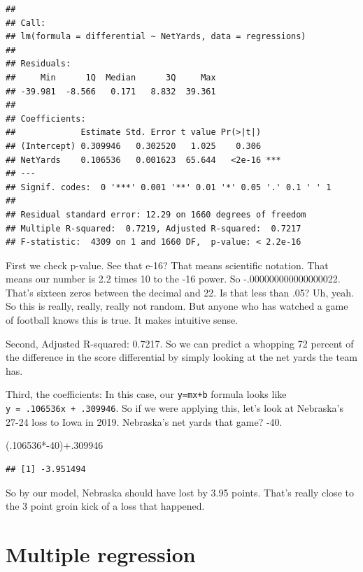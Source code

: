 \documentclass[
]{book}
\newenvironment{Shaded}{\begin{snugshade}}{\end{snugshade}}
\newcommand{\DecValTok}[1]{\textcolor[rgb]{0.00,0.00,0.81}{#1}}
\newcommand{\NormalTok}[1]{#1}
\newcommand{\SpecialCharTok}[1]{\textcolor[rgb]{0.00,0.00,0.00}{#1}}
\begin{document}
\begin{verbatim}
## 
## Call:
## lm(formula = differential ~ NetYards, data = regressions)
## 
## Residuals:
##     Min      1Q  Median      3Q     Max 
## -39.981  -8.566   0.171   8.832  39.361 
## 
## Coefficients:
##             Estimate Std. Error t value Pr(>|t|)    
## (Intercept) 0.309946   0.302520   1.025    0.306    
## NetYards    0.106536   0.001623  65.644   <2e-16 ***
## ---
## Signif. codes:  0 '***' 0.001 '**' 0.01 '*' 0.05 '.' 0.1 ' ' 1
## 
## Residual standard error: 12.29 on 1660 degrees of freedom
## Multiple R-squared:  0.7219, Adjusted R-squared:  0.7217 
## F-statistic:  4309 on 1 and 1660 DF,  p-value: < 2.2e-16
\end{verbatim}

First we check p-value. See that e-16? That means scientific notation. That means our number is 2.2 times 10 to the -16 power. So -.000000000000000022. That's sixteen zeros between the decimal and 22. Is that less than .05? Uh, yeah. So this is really, really, really not random. But anyone who has watched a game of football knows this is true. It makes intuitive sense.

Second, Adjusted R-squared: 0.7217. So we can predict a whopping 72 percent of the difference in the score differential by simply looking at the net yards the team has.

Third, the coefficients: In this case, our \texttt{y=mx+b} formula looks like \texttt{y\ =\ .106536x\ +\ .309946}. So if we were applying this, let's look at Nebraska's 27-24 loss to Iowa in 2019. Nebraska's net yards that game? -40.

\begin{Shaded}
\begin{Highlighting}[]
\NormalTok{(.}\DecValTok{106536}\SpecialCharTok{*{-}}\DecValTok{40}\NormalTok{)}\SpecialCharTok{+}\NormalTok{.}\DecValTok{309946} 
\end{Highlighting}
\end{Shaded}

\begin{verbatim}
## [1] -3.951494
\end{verbatim}

So by our model, Nebraska should have lost by 3.95 points. That's really close to the 3 point groin kick of a loss that happened.

\hypertarget{multiple-regression}{%
\chapter{Multiple regression}\label{multiple-regression}}
\end{document}
